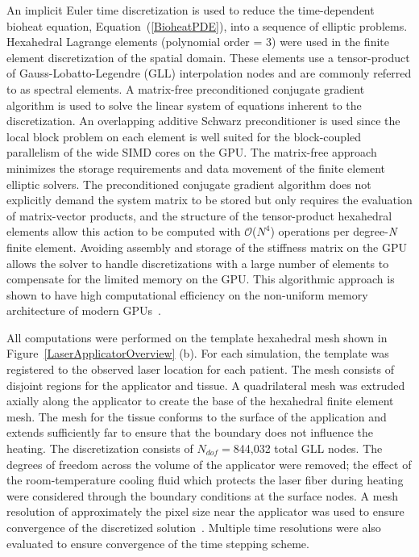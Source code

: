 \documentclass[12pt]{article}
\newcommand{\eqn}[1]{(\ref{#1})}
\begin{document}
An implicit Euler time discretization is used to reduce the 
time-dependent bioheat equation, Equation~\eqn{BioheatPDE}, into a sequence of elliptic problems. 
Hexahedral Lagrange elements (polynomial order = 3) were used in the finite
element discretization of the spatial domain.
These elements use a tensor-product of Gauss-Lobatto-Legendre (GLL) interpolation
nodes and are commonly referred to as spectral elements.  
A matrix-free preconditioned conjugate gradient algorithm is used to solve the
linear system of equations inherent to the discretization.  
An overlapping additive Schwarz preconditioner is used since the local
block problem on each element is well suited for the block-coupled
parallelism of the wide SIMD cores on the GPU.  
The matrix-free approach minimizes the storage
requirements and data movement of the finite element elliptic solvers.  The
preconditioned conjugate gradient algorithm does not explicitly demand the system
matrix to be stored but only requires the evaluation of matrix-vector products,
and the structure of the tensor-product hexahedral elements allow this action
to be computed with $\mathcal{O}$($N^4$) operations per degree-\textit{N} finite
element.  
Avoiding assembly and storage of the stiffness matrix on the GPU
allows the solver to handle discretizations with a large number of elements to
compensate for the limited memory on the GPU.  This algorithmic approach is
shown to have high computational efficiency on the non-uniform memory
architecture of modern GPUs~\cite{Medina2014}.

All computations were performed on the template hexahedral mesh
shown in Figure~\ref{LaserApplicatorOverview} (b).
For each simulation, the template was registered to the observed
laser location for each patient.
The mesh consists of disjoint regions for the applicator and tissue.
A quadrilateral mesh was extruded axially along the applicator to create
the base of the hexahedral finite element mesh. The mesh for the tissue
conforms to the surface of the application and extends sufficiently far
to ensure that the boundary does not influence the heating.
The discretization consists of $N_{dof}=$844,032 total GLL nodes. 
The degrees of freedom across the volume of the applicator were removed;
the effect of the room-temperature cooling fluid which protects the laser fiber
during heating were considered through the boundary conditions at the surface
nodes. 
{\color{red}
A mesh resolution of approximately the pixel size near the applicator was used
to ensure convergence of the discretized solution~\cite{fuentesetal11a}. 
Multiple time resolutions were also evaluated to ensure convergence of the
time stepping scheme.
}
\end{document}
